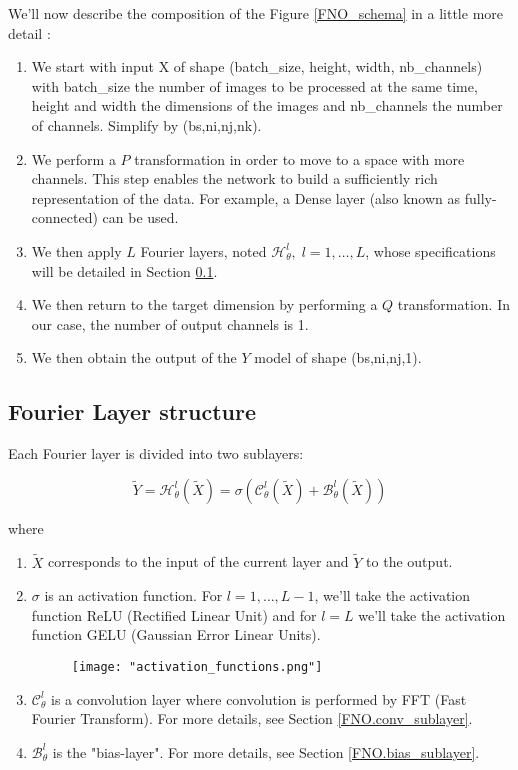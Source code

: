 \newpage

We'll now describe the composition of the Figure \ref{FNO_schema} in a little more detail :
\begin{enumerate}[label=\textbullet]
	\item We start with input X of shape (batch\_size, height, width, nb\_channels) with batch\_size the number of images to be processed at the same time, height and width the dimensions of the images and nb\_channels the number of channels. Simplify by (bs,ni,nj,nk).
	\item We perform a $P$ transformation in order to move to a space with more channels. This step enables the network to build a sufficiently rich representation of the data.  For example, a Dense layer (also known as fully-connected) can be used. 	
	\item We then apply $L$ Fourier layers, noted $\mathcal{H}_\theta^l,\; l=1,\dots,L$, whose specifications will be detailed in Section \ref{FNO.fourierlayer}.
	\item We then return to the target dimension by performing a $Q$ transformation. In our case, the number of output channels is 1.
	\item We then obtain the output of the $Y$ model of shape (bs,ni,nj,1). 
\end{enumerate}

\subsection{Fourier Layer structure} \label{FNO.fourierlayer}

Each Fourier layer is divided into two sublayers:

\begin{equation*}
	\tilde{Y}=\mathcal{H}_\theta^l(\tilde{X})=\sigma\left(\mathcal{C}_\theta^l(\tilde{X})+\mathcal{B}_\theta^l(\tilde{X})\right)
\end{equation*}

where
\begin{enumerate}[label=\textbullet]
	\item $\tilde{X}$ corresponds to the input of the current layer and $\tilde{Y}$ to the output.
	\item $\sigma$ is an activation function. For $l=1,\dots,L-1$, we'll take the activation function ReLU (Rectified Linear Unit) and for $l=L$ we'll take the activation function GELU (Gaussian Error Linear Units).
	\begin{figure}[H]
		\centering
		\texttt{[image: "activation\_functions.png"]}
	\end{figure}
	
	\item $\mathcal{C}_\theta^l$ is a convolution layer where convolution is performed by FFT (Fast Fourier Transform). For more details, see Section \ref{FNO.conv_sublayer}.
	\item $\mathcal{B}_\theta^l$ is the "bias-layer". For more details, see Section \ref{FNO.bias_sublayer}.
\end{enumerate}

